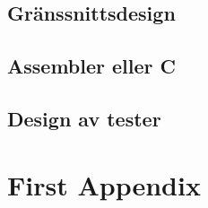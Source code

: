\documentclass[11pt]{article}
\begin{document}
\begin{flushleft}
\subsection{Gränssnittsdesign}

\subsection{Assembler eller C}

\subsection{Design av tester}

\pagebreak
{}



\pagebreak
\appendix
\section{First Appendix}

\end{flushleft}
\end{document}
